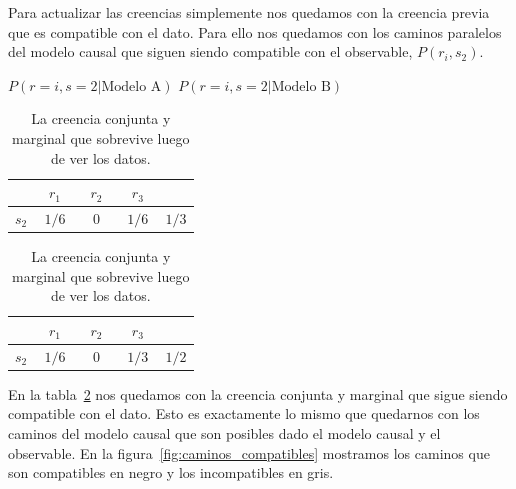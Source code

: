 \documentclass[a4paper,10pt]{book}
\theoremstyle{definition}
\begin{document}

Para actualizar las creencias simplemente nos quedamos con la creencia previa que es compatible con el dato.
%
Para ello nos quedamos con los caminos paralelos del modelo causal que siguen siendo compatible con el observable, $P(r_i, s_2)$.
%
\begin{table}[ht!]
\centering
$P(r=i, s=2 | \text{Modelo A})$ \hspace{2.7cm} $P(r=i, s=2 | \text{Modelo B})$ \\[0.1cm]
\begin{tabular}{|c|c|c|c||c|} \hline \setlength\tabcolsep{0.4cm}
       & \, $r_1$ \, &  \, $r_2$ \, & \, $r_3$ \, & \\ \hline 
  $s_2$ & $1/6$ & $0$ & $1/6$ & $1/3$ \\ \hline
  \end{tabular}
  \hspace{1.5cm}
  \begin{tabular}{|c|c|c|c||c|} \hline  \setlength\tabcolsep{0.4cm} 
 & \, $r_1$ \, &  \, $r_2$ \, & \, $r_3$ \, & \\ \hline 
  $s_2$ & $1/6$ & $0$ & $1/3$ & $1/2$ \\ \hline
  \end{tabular}
  \caption{La creencia conjunta y marginal que sobrevive luego de ver los datos. }
  \label{tab:creencia_compatible}
\end{table}

En la tabla~\ref{tab:creencia_compatible} nos quedamos con la creencia conjunta y marginal que sigue siendo compatible con el dato.
%
Esto es exactamente lo mismo que quedarnos con los caminos del modelo causal que son posibles dado el modelo causal y el observable.
%
En la figura~\ref{fig:caminos_compatibles} mostramos los caminos que son compatibles en negro y los incompatibles en gris.
\end{document}
